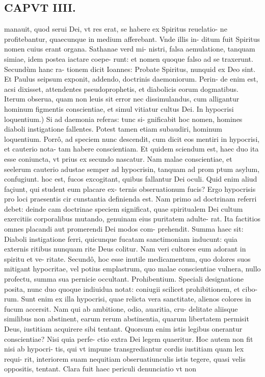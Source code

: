 \documentclass{article}
\begin{document}
\begin{pages}
\section*{CAPVT IIII. }
\marginpar{[ p.45 ]}\pstart manauit, quod serui Dei, vt res erat, se habere ex Spiritus reuelatio- ne profitebantur, quaecunque in medium afferebant. Vnde illis in- ditum fuit Spiritus nomen cuius erant organa. Sathanae verd mi- nistri, falsa aemulatione, tanquam simiae, idem postea iactare coepe- runt: et nomen quoque falso ad se traxerunt. Secundùm hanc ra- tionem dicit Ioannes: Probate Spiritus, nunquid ex Deo sint. Et Paulus seipsum exponit, addendo, doctrinis daemoniorum. Perin- de enim est, acsi dixisset, attendentes pseudoprophetis, et diabolicis eorum dogmatibus. Iterum obserua, quam non leuis sit error nec dissimulandus, cum alligantur hominum figmentis conscientiae, et simul vitiatur cultus Dei.  \pend\pstart In hypocrisi loquentium.) Si ad daemonia referas: tunc si- gnificabit hoc nomen, homines diaboli instigatione fallentes. Potest tamen etiam subaudiri, hominum loquentium. Porrô, ad speciem nunc descendit, cum dicit eos mentiri in hypocrisi, et cauterio nota- tam habere conscientiam. Et quidem sciendum est, haec duo ita esse coniuncta, vt prius ex secundo nascatur. Nam malae conscientiae, et seelerum cauterio adustae semper ad hypocrisin, tanquam ad prom ptum asylum, confugiunt. hoc est, fucos excogitant, quibus fallantur Dei oculi. Quid enim aliud façiunt, qui student eum placare ex- ternis obseruationum fucis? Ergo hypocrisis pro loci praesentis cir cunstantia definienda est. Nam primo ad doctrinam referri debet: deinde cam doctrinae speciem significat, quae spiritualem Dei cultum exercitiis corporalibus mutando, genuinam eius puritatem adulte- rat. Ita factitios omnes placandi aut promerendi Dei modos com- prehendit. Summa haec sit: Diaboli instigatione ferri, quicunque fucatam sanctimoniam inducunt: quia externis ritibus nunquam rite Deus colitur. Nam veri cultores eum adorant in spiritu et ve- ritate. Secundô, hoc esse inutile medicamentum, quo dolores suos mitigant hypocritae, vel potius emplastrum, quo malae conscientiae vulnera, nullo profectu, summa sua pernicie occultant.  \pend\pstart Prohibentium. Speciali designatione posita, nunc duo quoque indiuidua notat: coniugii scilicet prohibitionem, et cibo- rum. Sunt enim ex illa hypocrisi, quae relicta vera sanctitate, alienos colores in fucum accersit. Nam qui ab ambitione, odio, auaritia, cru- delitate aliisque similibus non abstinent, earum rerum abstinentia, quarum libertatem permisit Deus, iustitiam acquirere sibi tentant. Quorsum enim istis legibus onerantur conscientiae? Nisi quia perfe- ctio extra Dei legem quaeritur. Hoc autem non fit nisi ab hypocri- tis, qui vt impune transgrediantur cordis iustitiam quam lex requi- rit, interiorem suam nequitiam obseruatiunculis istis tegere, quasi velis oppositis, tentant. Clara fuit haec periculi denunciatio vt non  \pend

\end{pages}
\end{document}
